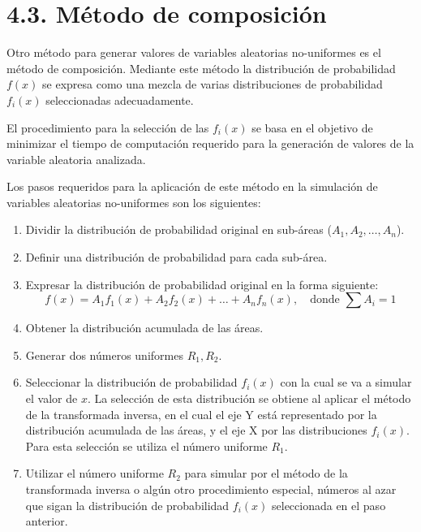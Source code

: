 \documentclass[11pt,letterpaper]{report}
\begin{document}
\section*{4.3. Método de composición}

Otro método para generar valores de variables aleatorias no-uniformes es el método de composición. Mediante este método la distribución de probabilidad $f(x)$ se expresa como una mezcla de varias distribuciones de probabilidad $f_i(x)$ seleccionadas adecuadamente.

El procedimiento para la selección de las $f_i(x)$ se basa en el objetivo de minimizar el tiempo de computación requerido para la generación de valores de la variable aleatoria analizada.

Los pasos requeridos para la aplicación de este método en la simulación de variables aleatorias no-uniformes son los siguientes:

\begin{enumerate}
    \item Dividir la distribución de probabilidad original en sub-áreas ($A_1, A_2, \dots, A_n$).
    \item Definir una distribución de probabilidad para cada sub-área.
    \item Expresar la distribución de probabilidad original en la forma siguiente:
    \begin{equation}
    f(x) = A_1 f_1(x) + A_2 f_2(x) + \dots + A_n f_n(x), \quad \text{donde } \sum A_i = 1
    \end{equation}
    \item Obtener la distribución acumulada de las áreas.
    \item Generar dos números uniformes $R_1, R_2$.
    \item Seleccionar la distribución de probabilidad $f_i(x)$ con la cual se va a simular el valor de $x$. La selección de esta distribución se obtiene al aplicar el método de la transformada inversa, en el cual el eje Y está representado por la distribución acumulada de las áreas, y el eje X por las distribuciones $f_i(x)$. Para esta selección se utiliza el número uniforme $R_1$.
    \item Utilizar el número uniforme $R_2$ para simular por el método de la transformada inversa o algún otro procedimiento especial, números al azar que sigan la distribución de probabilidad $f_i(x)$ seleccionada en el paso anterior.
\end{enumerate}
\end{document}

